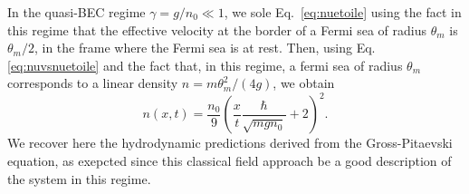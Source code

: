 \documentclass[submission, Phys]{SciPost}
\begin{document}
In the quasi-BEC regime $\gamma=g/n_0\ll 1$, we sole Eq.~\eqref{eq:nuetoile} using the fact in this regime that the effective velocity at the border of a Fermi sea of radius $\theta_m$ is 
$\theta_m/2$, in the frame where the Fermi sea is at rest. Then, using Eq.\eqref{eq:nuvsnuetoile} and the fact that, in this regime, a fermi sea of radius $\theta_m$ corresponds to a linear density $n=m\theta_m^2/(4 g)$, we obtain
\begin{equation}
    n(x,t)= \frac{n_0}{9}\left ( \frac{x}{t}\frac{\hbar}{\sqrt{mgn_0}} +2 \right )^2  .
\end{equation}
We recover here the hydrodynamic predictions derived from the Gross-Pitaevski equation\cite{el_decay_1995,xu_dispersive_2017}, as exepcted since this classical field approach be a good description of the system in this regime. 



\end{document}
